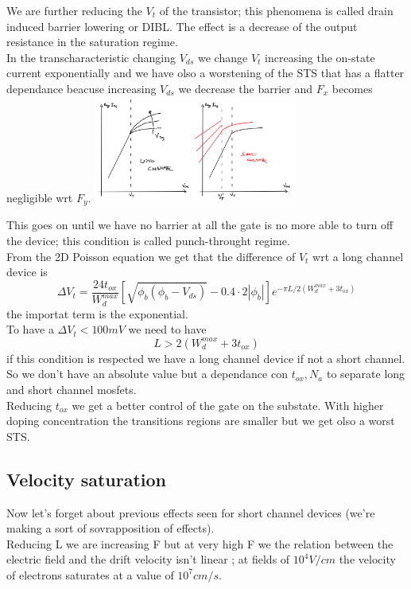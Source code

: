We are further reducing the $V_t$ of the transistor; this phenomena is called drain induced barrier lowering or DIBL. The effect is a decrease of the output resistance in the saturation regime.\\
In the transcharacteristic changing $V_{ds}$ we change $V_t$ increasing the on-state current exponentially and we have olso a worstening of the STS that has a flatter dependance beacuse increasing $V_{ds}$ we decrease the barrier and $F_x$ becomes negligible wrt $F_y$.
\centering
\includegraphics[width=0.5\textwidth]{shorttc.png}\\
\raggedright
This goes on until we have no barrier at all the gate is no more able to turn off the device; this condition is called punch-throught regime.\\
From the 2D Poisson equation we get that the difference of $V_t$ wrt a long channel device is 
\begin{equation}
\Delta V_t= \frac{24t_{ox}}{W_d^{max}}[\sqrt{\phi_b(\phi_b-V_{ds})}-0.4\cdot 2|\phi_b|]e^{-\pi L/2(W_d^{max}+3t_{ox})}
\end{equation} 
the importat term is the exponential.\\
To have a $\Delta V_t<100mV$ we need to have 
\begin{equation}
L>2(W_d^{max}+3t_{ox})
\end{equation}
if this condition is respected we have a long channel device if not a short channel. So we don't have an absolute value but a dependance con $t_{ox},N_a$ to separate long and short channel mosfets.\\
Reducing $t_{ox}$ we get a better control of the gate on the substate. With higher doping concentration the transitions regions are smaller but we get olso a worst STS.\\

\subsection{Velocity saturation}
Now let's forget about previous effects seen for short channel devices (we're making a sort of sovrapposition of effects).\\
Reducing L we are increasing F but at very high F we the relation between the electric field and the drift velocity isn't linear ; at fields of $10^4 V/cm$ the velocity of electrons saturates at a value of $10^7 cm/s$.\\

